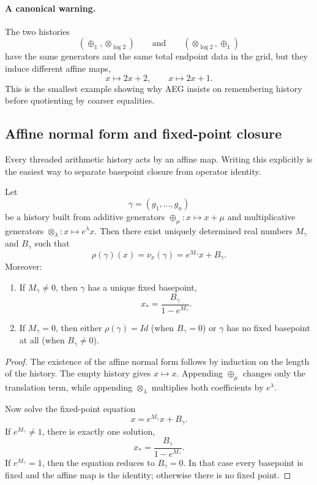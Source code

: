 \paragraph{A canonical warning.}
The two histories
\[
(\oplus_1,\otimes_{\log 2})
\qquad\text{and}\qquad
(\otimes_{\log 2},\oplus_1)
\]
have the same generators and the same total endpoint data in the grid, but they induce different affine maps,
\[
x\longmapsto 2x+2,
\qquad
x\longmapsto 2x+1.
\]
This is the smallest example showing why AEG insists on remembering history before quotienting by coarser equalities.

\subsection{Affine normal form and fixed-point closure}
\label{appE:fixed-point-closure}

Every threaded arithmetic history acts by an affine map. Writing this explicitly is the easiest way to separate basepoint closure from operator identity.

\begin{proposition}
\label{prop:appE-affine-normal-form}
Let
\[
\gamma=(g_1,\dots,g_n)
\]
be a history built from additive generators $\oplus_\mu:x\mapsto x+\mu$ and multiplicative generators $\otimes_\lambda:x\mapsto e^\lambda x$.
Then there exist uniquely determined real numbers $M_\gamma$ and $B_\gamma$ such that
\[
\rho(\gamma)(x)=\nu_x(\gamma)=e^{M_\gamma}x+B_\gamma.
\]
Moreover:
\begin{enumerate}
    \item If $M_\gamma\neq 0$, then $\gamma$ has a unique fixed basepoint,
    \[
    x_\ast=\frac{B_\gamma}{1-e^{M_\gamma}}.
    \]
    \item If $M_\gamma=0$, then either $\rho(\gamma)=Id$ (when $B_\gamma=0$) or $\gamma$ has no fixed basepoint at all (when $B_\gamma\neq 0$).
\end{enumerate}
\end{proposition}

\begin{proof}
The existence of the affine normal form follows by induction on the length of the history. The empty history gives $x\mapsto x$. Appending $\oplus_\mu$ changes only the translation term, while appending $\otimes_\lambda$ multiplies both coefficients by $e^\lambda$.

Now solve the fixed-point equation
\[
x=e^{M_\gamma}x+B_\gamma.
\]
If $e^{M_\gamma}\neq 1$, there is exactly one solution,
\[
x_\ast=\frac{B_\gamma}{1-e^{M_\gamma}}.
\]
If $e^{M_\gamma}=1$, then the equation reduces to $B_\gamma=0$. In that case every basepoint is fixed and the affine map is the identity; otherwise there is no fixed point.
\end{proof}

